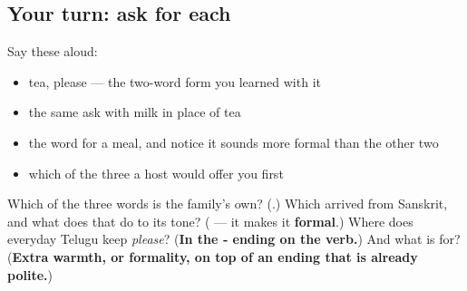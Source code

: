 \subsection*{Your turn: ask for each}
Say these aloud:

\begin{itemize}
\raggedright
  \item tea, please — the two-word form you learned with it
  \item the same ask with milk in place of tea
  \item the word for a meal, and notice it sounds more formal than the other two
  \item which of the three a host would offer you first
\end{itemize}

\begin{tcolorbox}[breakable,colback=teal!4,colframe=teal!35!black,title={Before you move on}]
Which of the three words is the family's own? (\textbf{}.) Which arrived from Sanskrit, and what does that do to its tone? (\textbf{} — it makes it \textbf{formal}.) Where does everyday Telugu keep \emph{please}? (\textbf{In the ‑ ending on the verb.}) And what is \textbf{} for? (\textbf{Extra warmth, or formality, on top of an ending that is already polite.})
\end{tcolorbox}
